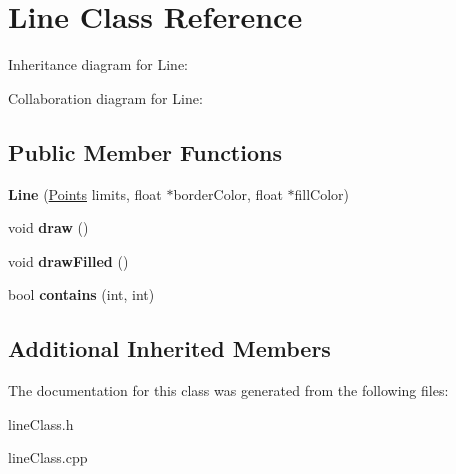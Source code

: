 \hypertarget{classLine}{}\section{Line Class Reference}
\label{classLine}


Inheritance diagram for Line\+:


Collaboration diagram for Line\+:
\subsection*{Public Member Functions}
\begin{DoxyCompactItemize}
\item 
{\bfseries Line} (\hyperlink{structPoints}{Points} limits, float $\ast$border\+Color, float $\ast$fill\+Color)\hypertarget{classLine_a430ccbf8b2c65dc182592bd21935b3f7}{}\label{classLine_a430ccbf8b2c65dc182592bd21935b3f7}

\item 
void {\bfseries draw} ()\hypertarget{classLine_ab6265993bf5acbc28830181c3e712f10}{}\label{classLine_ab6265993bf5acbc28830181c3e712f10}

\item 
void {\bfseries draw\+Filled} ()\hypertarget{classLine_a99b9ce2c33ec439dbb4bd73fc349e87d}{}\label{classLine_a99b9ce2c33ec439dbb4bd73fc349e87d}

\item 
bool {\bfseries contains} (int, int)\hypertarget{classLine_a77cc86c5e64f2d9dc61ccbd773cccd85}{}\label{classLine_a77cc86c5e64f2d9dc61ccbd773cccd85}

\end{DoxyCompactItemize}
\subsection*{Additional Inherited Members}


The documentation for this class was generated from the following files\+:\begin{DoxyCompactItemize}
\item 
line\+Class.\+h\item 
line\+Class.\+cpp\end{DoxyCompactItemize}
